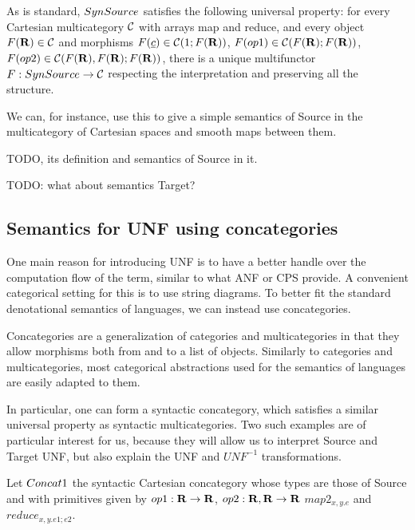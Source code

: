 As is standard, $SynSource$ satisfies the following universal property: 
for every Cartesian multicategory $\mathcal{C}$ with arrays map and reduce,
and every object $F(\mathbf{R})\in\mathcal{C}$ and morphisms $F(\underline{c})\in\mathcal{C}(1;F(\mathbf{R}))$, 
$F(op1)\in\mathcal{C}(F(\mathbf{R});F(\mathbf{R}))$, $F(op2)\in\mathcal{C}(F(\mathbf{R}),F(\mathbf{R});F(\mathbf{R}))$, there is a unique
multifunctor $F:SynSource\to\mathcal{C}$ respecting the interpretation and preserving all the structure.

We can, for instance, use this to give a simple semantics of Source 
in the multicategory of Cartesian spaces and smooth maps between them. 

\begin{definition}[CartSp]
    TODO, its definition and semantics of Source in it.
\end{definition}

TODO: what about semantics Target?

\subsection{Semantics for UNF using concategories} %
\label{sub:Semantics for UNF using concategories}

One main reason for introducing UNF is to have a better handle over
the computation flow of the term, similar to what ANF or CPS provide. 
A convenient categorical setting for this is to use string diagrams.
To better fit the standard denotational semantics of languages, 
we can instead use concategories. 

Concategories are a generalization of categories and multicategories in that 
they allow morphisms both from and to a list of objects. 
Similarly to categories and multicategories, 
most categorical abstractions used for the semantics of languages are easily adapted to them.

In particular, one can form a syntactic concategory, 
which satisfies a similar universal property as syntactic multicategories.
Two such examples are of particular interest for us, 
because they will allow us to interpret Source and Target UNF, 
but also explain the UNF and $UNF^{-1}$ transformations.

\begin{definition}[$\ConcatS$]
Let $\ConcatS$ the syntactic Cartesian concategory whose types are those of Source and 
with primitives given by $op1: \mathbf{R} \to \mathbf{R}$, $op2: \mathbf{R},\mathbf{R} \to \mathbf{R}$ $map2_{x,y.e}$
and $reduce_{x,y.e1;e2}$.
\end{definition}

